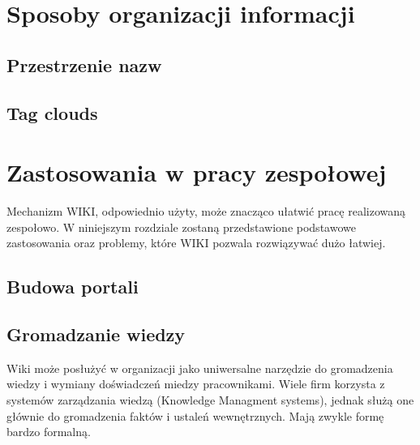 \documentclass{article}
\begin{document}
\newpage
\section{Sposoby organizacji informacji}	
	\subsection{Przestrzenie nazw}
	\subsection{Tag clouds}


	

\newpage
\section{Zastosowania w pracy zespołowej}
Mechanizm WIKI, odpowiednio użyty, może znacząco ułatwić pracę realizowaną zespołowo. W niniejszym rozdziale zostaną przedstawione podstawowe zastosowania oraz problemy, które WIKI pozwala rozwiązywać dużo łatwiej. 
	\subsection{Budowa portali}  




	\subsection{Gromadzanie wiedzy}

		Wiki może posłużyć w organizacji jako uniwersalne narzędzie do gromadzenia wiedzy i wymiany doświadczeń miedzy pracownikami. Wiele firm korzysta z systemów zarządzania wiedzą (Knowledge Managment systems), jednak służą one głównie do gromadzenia faktów i ustaleń wewnętrznych. Mają zwykle formę bardzo formalną.
\end{document}
